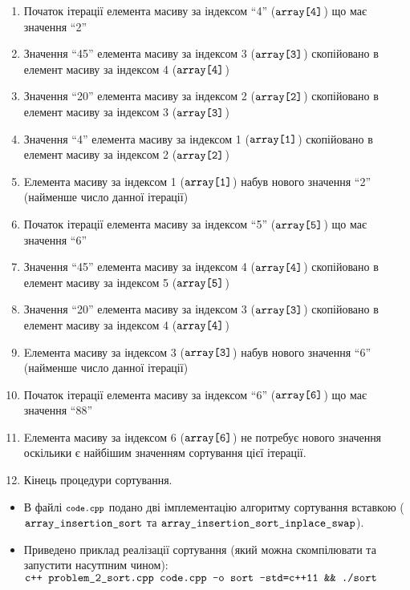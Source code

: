 \begin{enumerate}
  \item Початок ітерації елемента масиву за індексом ``4'' ($\normalsize\texttt{array[4]}$) що має значення ``2''
  \item Значення ``45'' елемента масиву за індексом 3 ($\normalsize\texttt{array[3]}$) скопійовано в елемент масиву за індексом 4 ($\normalsize\texttt{array[4]}$)
  \item Значення ``20'' елемента масиву за індексом 2 ($\normalsize\texttt{array[2]}$) скопійовано в елемент масиву за індексом 3 ($\normalsize\texttt{array[3]}$)
  \item Значення ``4'' елемента масиву за індексом 1 ($\normalsize\texttt{array[1]}$) скопійовано в елемент масиву за індексом 2 ($\normalsize\texttt{array[2]}$)
  \item Eлемента масиву за індексом 1 ($\normalsize\texttt{array[1]}$) набув нового значення ``2'' (найменше число данної ітерації)
  \item Початок ітерації елемента масиву за індексом ``5'' ($\normalsize\texttt{array[5]}$) що має значення ``6''
  \item Значення ``45'' елемента масиву за індексом 4 ($\normalsize\texttt{array[4]}$) скопійовано в елемент масиву за індексом 5 ($\normalsize\texttt{array[5]}$)
  \item Значення ``20'' елемента масиву за індексом 3 ($\normalsize\texttt{array[3]}$) скопійовано в елемент масиву за індексом 4 ($\normalsize\texttt{array[4]}$)
  \item Eлемента масиву за індексом 3 ($\normalsize\texttt{array[3]}$) набув нового значення ``6'' (найменше число данної ітерації)
  \item Початок ітерації елемента масиву за індексом ``6'' ($\normalsize\texttt{array[6]}$) що має значення ``88''
  \item Eлемента масиву за індексом 6 ($\normalsize\texttt{array[6]}$) не потребує нового значення оскільики є найбішим значенням сортування цієї ітерації.
  \item Кінець процедури сортування.
\end{enumerate}
\begin{center}
  \Large{}
\end{center}
\begin{itemize}
  \item В файлі $\footnotesize\texttt{code.cpp}$ подано дві імплементацію алгоритму сортування вставкою ($\normalsize\texttt{array\_insertion\_sort}$ та $\normalsize\texttt{array\_insertion\_sort\_inplace\_swap}$).
  \item Приведено приклад реалізації сортування (який можна скомпілювати та запустити насутпним чином): \\
  $\normalsize\texttt{c++ problem\_2\_sort.cpp code.cpp -o sort -std=c++11 \&\& ./sort}$
\end{itemize}
